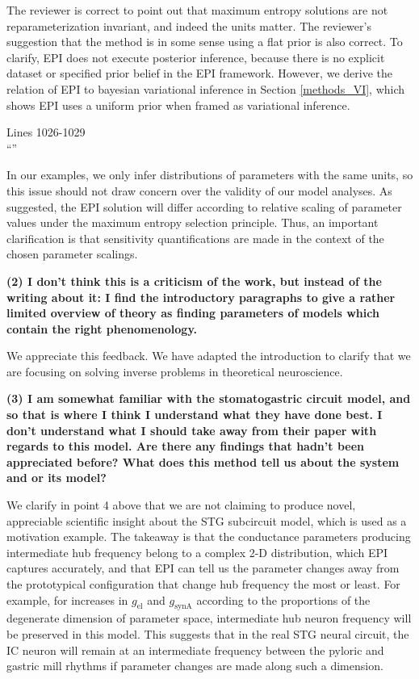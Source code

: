 \documentclass[11pt,a4paper]{article}
\begin{document}
The reviewer is correct to point out that maximum entropy solutions are not reparameterization invariant, and indeed the units matter.  The reviewer’s suggestion that the method is in some sense using a flat prior is also correct.  To clarify, EPI does not execute posterior inference, because there is no explicit dataset or specified prior belief in the EPI framework.  
However, we derive the relation of EPI to bayesian variational inference in Section \ref{methods_VI}, which shows EPI uses a uniform prior when framed as variational inference.

\begin{displayquote}
Lines 1026-1029 \\
``''
\end{displayquote}
 
In our examples, we only infer distributions of parameters with the same units, so this issue should not draw concern over the validity of our model analyses.  As suggested, the EPI solution will differ according to relative scaling of parameter values under the maximum entropy selection principle. Thus, an important clarification is that sensitivity quantifications are made in the context of the chosen parameter scalings. 

\textbf{(2) I don't think this is a criticism of the work, but instead of the writing about it: I find the introductory paragraphs to give a rather limited overview of theory as finding parameters of models which contain the right phenomenology. }

We appreciate this feedback.  We have adapted the introduction to clarify that we are focusing on solving inverse problems in theoretical neuroscience.

\textbf{(3) I am somewhat familiar with the stomatogastric circuit model, and so that is where I think I understand what they have done best. I don't understand what I should take away from their paper with regards to this model. Are there any findings that hadn't been appreciated before? What does this method tell us about the system and or its model? }

We clarify in point 4 above that we are not claiming to produce novel, appreciable scientific insight about the STG subcircuit model, which is used as a motivation example. The takeaway is that the conductance parameters producing intermediate hub frequency belong to a complex 2-D distribution, which EPI captures accurately, and that EPI can tell us the parameter changes away from the prototypical configuration that change hub frequency the most or least.  For example, for increases in $g_{\text{el}}$ and $g_{\text{synA}}$ according to the proportions of the degenerate dimension of parameter space, intermediate hub neuron frequency will be preserved in this model.  This suggests that in the real STG neural circuit, the IC neuron will remain at an intermediate frequency between the pyloric and gastric mill rhythms if parameter changes are made along such a dimension.
\end{document}
